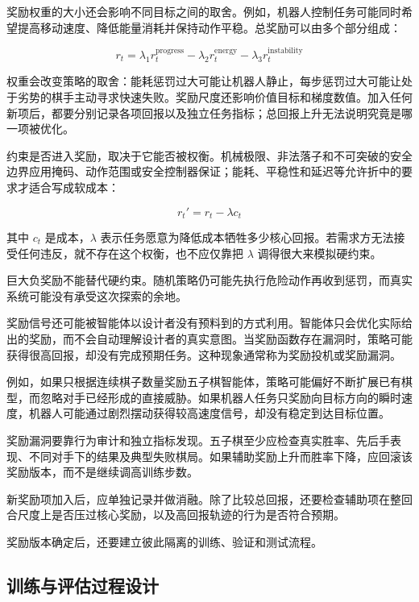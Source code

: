 \documentclass[UTF8,a4paper,zihao=-4,oneside,openany]{ctexbook}
\begin{document}
奖励权重的大小还会影响不同目标之间的取舍。例如，机器人控制任务可能同时希望提高移动速度、降低能量消耗并保持动作平稳。总奖励可以由多个部分组成：

\begin{equation}
r_t
=
\lambda_1 r_t^{\mathrm{progress}}
-
\lambda_2 r_t^{\mathrm{energy}}
-
\lambda_3 r_t^{\mathrm{instability}}
\end{equation}

权重会改变策略的取舍：能耗惩罚过大可能让机器人静止，每步惩罚过大可能让处于劣势的棋手主动寻求快速失败。奖励尺度还影响价值目标和梯度数值。加入任何新项后，都要分别记录各项回报以及独立任务指标；总回报上升无法说明究竟是哪一项被优化。

约束是否进入奖励，取决于它能否被权衡。机械极限、非法落子和不可突破的安全边界应用掩码、动作范围或安全控制器保证；能耗、平稳性和延迟等允许折中的要求才适合写成软成本：

\begin{equation}
r_t'
=
r_t
-
\lambda c_t
\end{equation}

其中 $c_t$ 是成本，$\lambda$ 表示任务愿意为降低成本牺牲多少核心回报。若需求方无法接受任何违反，就不存在这个权衡，也不应仅靠把 $\lambda$ 调得很大来模拟硬约束。


巨大负奖励不能替代硬约束。随机策略仍可能先执行危险动作再收到惩罚，而真实系统可能没有承受这次探索的余地。

奖励信号还可能被智能体以设计者没有预料到的方式利用。智能体只会优化实际给出的奖励，而不会自动理解设计者的真实意图。当奖励函数存在漏洞时，策略可能获得很高回报，却没有完成预期任务。这种现象通常称为奖励投机或奖励漏洞。

例如，如果只根据连续棋子数量奖励五子棋智能体，策略可能偏好不断扩展已有棋型，而忽略对手已经形成的直接威胁。如果机器人任务只奖励向目标方向的瞬时速度，机器人可能通过剧烈摆动获得较高速度信号，却没有稳定到达目标位置。

奖励漏洞要靠行为审计和独立指标发现。五子棋至少应检查真实胜率、先后手表现、不同对手下的结果及典型失败棋局。如果辅助奖励上升而胜率下降，应回滚该奖励版本，而不是继续调高训练步数。

新奖励项加入后，应单独记录并做消融。除了比较总回报，还要检查辅助项在整回合尺度上是否压过核心奖励，以及高回报轨迹的行为是否符合预期。

奖励版本确定后，还要建立彼此隔离的训练、验证和测试流程。

\subsection{训练与评估过程设计}
\end{document}
